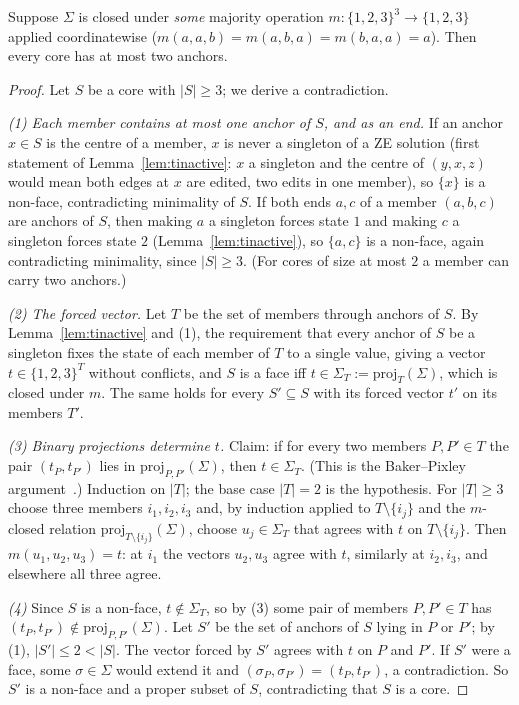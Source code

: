 \begin{lemma}\label{lem:tmaj}
Suppose $\Sigma$ is closed under \emph{some} majority operation $m:\{1,2,3\}^3\to\{1,2,3\}$ applied coordinatewise ($m(a,a,b)=m(a,b,a)=m(b,a,a)=a$). Then every core has at most two anchors.
\end{lemma}
\begin{proof}
Let $S$ be a core with $|S|\ge3$; we derive a contradiction.

\emph{(1) Each member contains at most one anchor of $S$, and as an end.} If an anchor $x\in S$ is the centre of a member, $x$ is never a singleton of a ZE solution (first statement of Lemma~\ref{lem:tinactive}: $x$ a singleton and the centre of $(y,x,z)$ would mean both edges at $x$ are edited, two edits in one member), so $\{x\}$ is a non-face, contradicting minimality of $S$. If both ends $a,c$ of a member $(a,b,c)$ are anchors of $S$, then making $a$ a singleton forces state $1$ and making $c$ a singleton forces state $2$ (Lemma~\ref{lem:tinactive}), so $\{a,c\}$ is a non-face, again contradicting minimality, since $|S|\ge3$. (For cores of size at most $2$ a member can carry two anchors.)

\emph{(2) The forced vector.} Let $T$ be the set of members through anchors of $S$. By Lemma~\ref{lem:tinactive} and (1), the requirement that every anchor of $S$ be a singleton fixes the state of each member of $T$ to a single value, giving a vector $t\in\{1,2,3\}^T$ without conflicts, and $S$ is a face iff $t\in \Sigma_T:=\mathrm{proj}_T(\Sigma)$, which is closed under $m$. The same holds for every $S'\subseteq S$ with its forced vector $t'$ on its members $T'$.

\emph{(3) Binary projections determine $t$.} Claim: if for every two members $P,P'\in T$ the pair $(t_P,t_{P'})$ lies in $\mathrm{proj}_{P,P'}(\Sigma)$, then $t\in \Sigma_T$. (This is the Baker--Pixley argument~\cite{BP75}.) Induction on $|T|$; the base case $|T|=2$ is the hypothesis. For $|T|\ge3$ choose three members $i_1,i_2,i_3$ and, by induction applied to $T\setminus\{i_j\}$ and the $m$-closed relation $\mathrm{proj}_{T\setminus\{i_j\}}(\Sigma)$, choose $u_j\in \Sigma_T$ that agrees with $t$ on $T\setminus\{i_j\}$. Then $m(u_1,u_2,u_3)=t$: at $i_1$ the vectors $u_2,u_3$ agree with $t$, similarly at $i_2,i_3$, and elsewhere all three agree.

\emph{(4)} Since $S$ is a non-face, $t\notin \Sigma_T$, so by (3) some pair of members $P,P'\in T$ has $(t_P,t_{P'})\notin\mathrm{proj}_{P,P'}(\Sigma)$. Let $S'$ be the set of anchors of $S$ lying in $P$ or $P'$; by (1), $|S'|\le2<|S|$. The vector forced by $S'$ agrees with $t$ on $P$ and $P'$. If $S'$ were a face, some $\sigma\in\Sigma$ would extend it and $(\sigma_P,\sigma_{P'})=(t_P,t_{P'})$, a contradiction. So $S'$ is a non-face and a proper subset of $S$, contradicting that $S$ is a core.
\end{proof}

